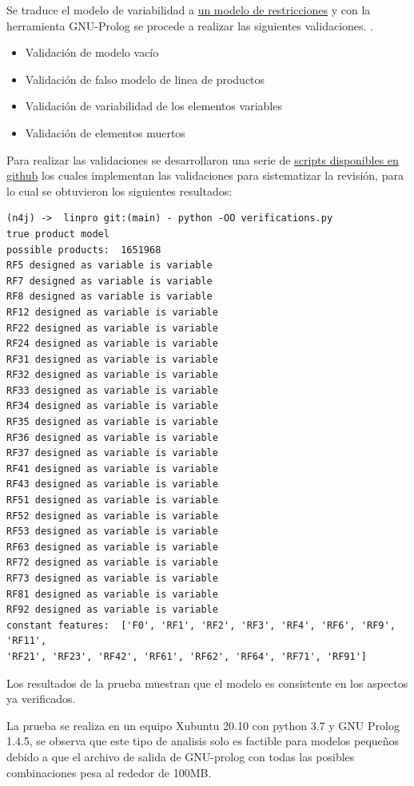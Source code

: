 \documentclass[letterpaper]{article}
\begin{document}
Se traduce el modelo de variabilidad a \href{https://github.com/ppsirg/puj-linea-producto/blob/main/inmueble.pl}{un modelo de restricciones} y con la herramienta GNU-Prolog se procede a realizar las siguientes validaciones. .

\begin{itemize}
    \item Validación de modelo vacío
    \item Validación de falso modelo de linea de productos
    \item Validación de variabilidad de los elementos variables
    \item Validación de elementos muertos
\end{itemize}

Para realizar las validaciones se desarrollaron una serie de \href{https://github.com/ppsirg/puj-linea-producto}{scripts disponibles en github} los cuales implementan las validaciones para sistematizar la revisión, para lo cual se obtuvieron los siguientes resultados:

\begin{verbatim}
(n4j) ->  linpro git:(main) - python -OO verifications.py
true product model
possible products:  1651968
RF5 designed as variable is variable
RF7 designed as variable is variable
RF8 designed as variable is variable
RF12 designed as variable is variable
RF22 designed as variable is variable
RF24 designed as variable is variable
RF31 designed as variable is variable
RF32 designed as variable is variable
RF33 designed as variable is variable
RF34 designed as variable is variable
RF35 designed as variable is variable
RF36 designed as variable is variable
RF37 designed as variable is variable
RF41 designed as variable is variable
RF43 designed as variable is variable
RF51 designed as variable is variable
RF52 designed as variable is variable
RF53 designed as variable is variable
RF63 designed as variable is variable
RF72 designed as variable is variable
RF73 designed as variable is variable
RF81 designed as variable is variable
RF92 designed as variable is variable
constant features:  ['F0', 'RF1', 'RF2', 'RF3', 'RF4', 'RF6', 'RF9', 'RF11', 
'RF21', 'RF23', 'RF42', 'RF61', 'RF62', 'RF64', 'RF71', 'RF91']

\end{verbatim}

Los resultados de la prueba muestran que el modelo es consistente en los aspectos ya verificados.


La prueba se realiza en un equipo Xubuntu 20.10 con python 3.7 y GNU Prolog 1.4.5, se observa que este tipo de analisis solo es factible para modelos pequeños debido a que el archivo de salida de GNU-prolog con todas las posibles combinaciones pesa al rededor de 100MB.
\end{document}
